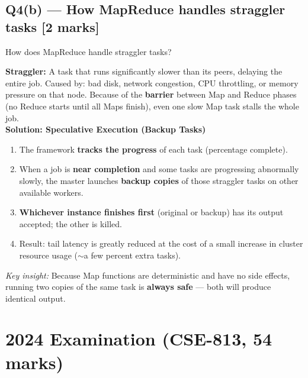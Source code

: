 \documentclass[12pt, a4paper]{article}
\newenvironment{qbox}{\begin{mdframed}[style=qframe]}{\end{mdframed}}
\newenvironment{solbox}{\begin{mdframed}[style=solframe]}{\end{mdframed}}
\newcommand{\qmarks}[1]{\hfill\textbf{\color{orange!70!black}[#1 marks]}}
\begin{document}
\subsection{Q4(b) --- How MapReduce handles straggler tasks
  \texorpdfstring{\qmarks{2}}{}}
\begin{qbox}How does MapReduce handle straggler tasks?\end{qbox}
\begin{solbox}
\textbf{Straggler:} A task that runs significantly slower than its peers, delaying the entire job.
Caused by: bad disk, network congestion, CPU throttling, or memory pressure on that node. Because
of the \textbf{barrier} between Map and Reduce phases (no Reduce starts until all Maps finish),
even one slow Map task stalls the whole job.\\[6pt]

\textbf{Solution: Speculative Execution (Backup Tasks)}
\begin{enumerate}[leftmargin=1.6cm, itemsep=3pt]
  \item The framework \textbf{tracks the progress} of each task (percentage complete).
  \item When a job is \textbf{near completion} and some tasks are progressing abnormally slowly,
    the master launches \textbf{backup copies} of those straggler tasks on other available workers.
  \item \textbf{Whichever instance finishes first} (original or backup) has its output accepted;
    the other is killed.
  \item Result: tail latency is greatly reduced at the cost of a small increase in cluster
    resource usage ($\sim$a few percent extra tasks).
\end{enumerate}

\textit{Key insight:} Because Map functions are deterministic and have no side effects, running two
copies of the same task is \textbf{always safe} --- both will produce identical output.
\end{solbox}

\section{2024 Examination (CSE-813, 54 marks)}

\end{document}
